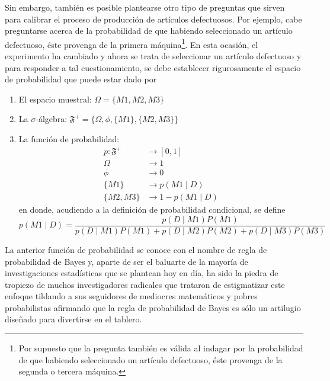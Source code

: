 \begin{Eje}
Sin embargo, también es posible plantearse otro tipo de preguntas que sirven para calibrar el proceso de producción de artículos defectuosos. Por ejemplo, cabe preguntarse acerca de la probabilidad de que habiendo seleccionado un artículo defectuoso, éste provenga de la primera máquina\footnote{Por supuesto que la pregunta también es válida al indagar por la probabilidad de que habiendo seleccionado un artículo defectuoso, éste provenga de la segunda o tercera máquina.}. En esta ocasión, el experimento ha cambiado y ahora se trata de seleccionar un artículo defectuoso y para responder a tal cuestionamiento, se debe establecer rigurosamente el espacio de probabilidad que puede estar dado por
\begin{enumerate}
  \item El espacio muestral: $\Omega=\{M1, M2, M3 \}$
  \item La $\sigma$-álgebra: $\mathfrak{F}^+=\{\Omega, \phi, \{M1\}, \{M2,M3\}\}$
  \item La función de probabilidad:
  \begin{align*}
  p: \mathfrak{F}^+ &\longrightarrow [0,1]\\
     \Omega &\longrightarrow 1\\
     \phi &\longrightarrow 0\\
     \{M1\}&\longrightarrow p(M1 \mid D)\\
     \{M2,M3\}&\longrightarrow 1-p(M1 \mid D)
  \end{align*}
  en donde, acudiendo a la definición de probabilidad condicional, se define
  \begin{equation*}
  p(M1 \mid D)=\frac{p(D \mid M1)P(M1)}{p(D \mid M1)P(M1)+p(D \mid M2)P(M2)+p(D \mid M3)P(M3)}
  \end{equation*}
\end{enumerate}

La anterior función de probabilidad se conoce con el nombre de regla de probabilidad de Bayes y, aparte de ser el baluarte de la mayoría de investigaciones estadísticas que se plantean hoy en día, ha sido la piedra de tropiezo de muchos investigadores radicales que trataron de estigmatizar este enfoque tildando a sus seguidores de mediocres matemáticos y pobres probabilistas afirmando que la regla de probabilidad de Bayes es sólo un artilugio diseñado para divertirse en el tablero.


\end{Eje}
